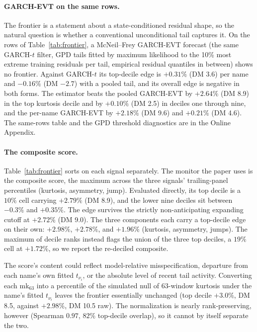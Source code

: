 \documentclass[11pt]{article}
\theoremstyle{remark}
\begin{document}
\paragraph{GARCH-EVT on the same rows.} The frontier is a statement about a state-conditioned residual shape, so the natural question is whether a conventional unconditional tail captures it. On the rows of Table~\ref{tab:frontier}, a McNeil--Frey GARCH-EVT forecast (the same GARCH-$t$ filter, GPD tails fitted by maximum likelihood to the 10\% most extreme training residuals per tail, empirical residual quantiles in between) shows no frontier. Against GARCH-$t$ its top-decile edge is $+0.31\%$ (DM 3.6) per name and $-0.16\%$ (DM $-2.7$) with a pooled tail, and its overall edge is negative in both forms. The estimator beats the pooled GARCH-EVT by $+2.64\%$ (DM 8.9) in the top kurtosis decile and by $+0.10\%$ (DM 2.5) in deciles one through nine, and the per-name GARCH-EVT by $+2.18\%$ (DM 9.6) and $+0.21\%$ (DM 4.6). The same-rows table and the GPD threshold diagnostics are in the Online Appendix.

\paragraph{The composite score.} Table~\ref{tab:frontier} sorts on each
signal separately. The monitor the paper uses is the composite
score, the maximum across the three signals' trailing-panel
percentiles (kurtosis, asymmetry, jump). Evaluated directly, its top
decile is a $10\%$ cell carrying $+2.79\%$ (DM 8.9), and the lower nine
deciles sit between $-0.3\%$ and $+0.35\%$. The edge survives the
strictly non-anticipating expanding cutoff at $+2.72\%$ (DM 9.0). The three components each carry a top-decile edge on their own: $+2.98\%$, $+2.78\%$, and $+1.96\%$ (kurtosis, asymmetry, jumps). The maximum of decile ranks instead flags the union of the three top deciles, a $19\%$ cell at $+1.72\%$, so we report the re-deciled composite.

The score's content could reflect model-relative
misspecification, departure from each name's own fitted $t_{\nu_i}$, or
the absolute level of recent tail activity. Converting each
mk$_{63}$ into a percentile of the simulated null of 63-window kurtosis
under the name's fitted $t_{\nu_i}$ leaves the frontier essentially
unchanged (top decile $+3.0\%$, DM 8.5, against $+2.98\%$, DM 10.5 raw).
The normalization is nearly rank-preserving, however (Spearman $0.97$, $82\%$
top-decile overlap), so it cannot by itself separate the two.
\end{document}
